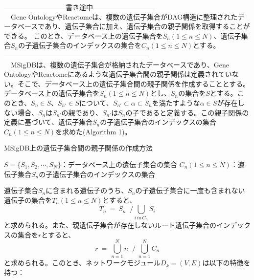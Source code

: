\documentclass[a4paper,12pt]{jsreport}
\begin{document}
\color{blue}---------------------------書き途中---------------------------\\
\color{black}
　Gene OntologyやReactomeは、複数の遺伝子集合がDAG構造に整理されたデータベースであり、遺伝子集合に加え、遺伝子集合の親子関係を取得することができる。
このとき、データベース上の遺伝子集合を$S_n(1\leq n\leq N)$、遺伝子集合$S_n$の子遺伝子集合のインデックスの集合を$C_n(1\leq n\leq N)$とする。\\
\color{blue}---------------------------------------------------------------\\
\color{black}
 　MSigDBは、複数の遺伝子集合が格納されたデータベースであり、Gene OntologyやReactomeにあるような遺伝子集合間の親子関係は定義されていない。そこで、データベース上の遺伝子集合間の親子関係を作成することとする。データベース上の遺伝子集合を$S_n(1\leq n\leq N)$とし、$S_n$の集合を$S$とする。このとき、$S_n \in S$、$S_{n'} \in S$について、$S_{n'} \subset \alpha \subset S_n$を満たすような$\alpha \in S$が存在しない場合、$S_n$は$S_{n'}$の親であり、$S_{n'}$は$S_n$の子であると定義する。この親子関係の定義に基づいて、遺伝子集合$S_n$の子遺伝子集合のインデックスの集合$C_n(1\leq n\leq N)$を求めた(Algorithm 1)。\\
 \begin{algorithm}[H]
 \caption{MSigDB上の遺伝子集合間の親子関係の作成方法}
 \begin{algorithmic}[1]
 \renewcommand{\algorithmicrequire}{\textbf{Input:}}
 \renewcommand{\algorithmicensure}{\textbf{Output:}}
 \REQUIRE $S = \{S_1, S_2, \cdots, S_N\}$：データベース上の遺伝子集合の集合
 \ENSURE  $C_n(1\leq n\leq N)$：遺伝子集合$S_n$の子遺伝子集合のインデックスの集合
 \ENDIF
 \ENDFOR
 \ENDFOR
 \end{algorithmic} 
 \end{algorithm}


遺伝子集合$S_n$に含まれる遺伝子のうち、$S_n$の子遺伝子集合に一度も含まれない遺伝子の集合を$T_n(1\leq n\leq N)$とすると、
　$$T_n \: = \: S_n \; \; / \bigcup_{i\, in\, C_n} \! S_i$$
と求められる。また、親遺伝子集合が存在しないルート遺伝子集合のインデックスの集合を$r$とすると、
　$$r \: = \: \bigcup_{n=1}^{N} n \; \; / \;  \bigcup_{n=1}^{N} C_n$$
と求められる。このとき、ネットワークモジュール$D_k = (V, E)$は以下の特徴を持つ：
\end{document}
